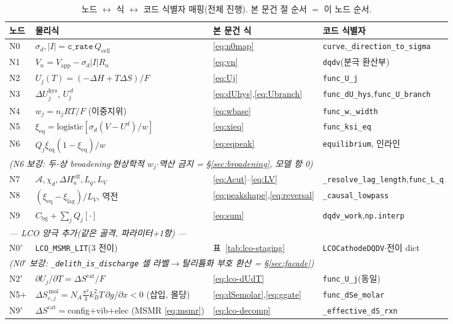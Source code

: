 \documentclass[11pt,a4paper]{article}
\newcommand{\eff}{\mathrm{eff}}
\newcommand{\eq}{\mathrm{eq}}
\newcommand{\app}{\mathrm{app}}
\newcommand{\cell}{\mathrm{cell}}
\newcommand{\bg}{\mathrm{bg}}
\newcommand{\hys}{\mathrm{hys}}
\newcommand{\code}[1]{\texttt{#1}}
\begin{document}
\begin{table}[t]
\centering
\renewcommand{\arraystretch}{1.3}
\caption{노드 $\leftrightarrow$ 식 $\leftrightarrow$ 코드 식별자 매핑(전체 진행). 본 문건 절 순서 $=$ 이 노드 순서.}
\label{tab:nodemap}
\begin{tabular}{l l l l}
\toprule
노드 & 물리식 & 본 문건 식 & 코드 식별자 \\
\midrule
N0 & $\sigma_d,|I|=\code{c\_rate}\,Q_\cell$ & \eqref{eq:n0map} & \code{curve},\code{\_direction\_to\_sigma} \\
N1 & $V_n=V_\app-\sigma_d|I|R_n$ & \eqref{eq:vn} & \code{dqdv}(분극 환산부) \\
N2 & $U_j(T)=(-\Delta H+T\Delta S)/F$ & \eqref{eq:Uj} & \code{func\_U\_j} \\
N3 & $\Delta U_j^\hys$, $U_j^{\,d}$ & \eqref{eq:dUhys},\eqref{eq:Ubranch} & \code{func\_dU\_hys},\code{func\_U\_branch} \\
N4 & $w_j=n_jRT/F$ (이중지위) & \eqref{eq:wbase} & \code{func\_w},\code{\_width} \\
N5 & $\xi_\eq=\mathrm{logistic}[\sigma_d(V-U^d)/w]$ & \eqref{eq:xieq} & \code{func\_ksi\_eq} \\
N6 & $Q_j\xi_\eq(1-\xi_\eq)/w$ & \eqref{eq:eqpeak} & \code{equilibrium}, 인라인 \\
\multicolumn{4}{l}{\emph{\quad(N6 보강: 두-상 broadening$\cdot$현상학적 $w_j$$\cdot$역산 금지 = \S\ref{sec:broadening}, 모델 항 0)}}\\
N7 & $\mathcal A,\chi_d,\Delta H_a^\eff,L_q,L_V$ & \eqref{eq:Acut}--\eqref{eq:LV} & \code{\_resolve\_lag\_length},\code{func\_L\_q} \\
N8 & $(\xi_\eq-\xi_\mathrm{lag})/L_V$, 역전 & \eqref{eq:peakshape},\eqref{eq:reversal} & \code{\_causal\_lowpass} \\
N9 & $C_\bg+\sum_jQ_j[\cdot]$ & \eqref{eq:sum} & \code{dqdv\_work},\code{np.interp} \\
\midrule
\multicolumn{4}{l}{\emph{— LCO 양극 추가(같은 골격, 파라미터+1항) —}}\\
N0$'$ & \code{LCO\_MSMR\_LIT}(3 전이) & 표~\ref{tab:lco-staging} & \code{LCOCathodeDQDV}$\cdot$전이 dict \\
\multicolumn{4}{l}{\emph{\quad(N0$'$ 보강: \code{\_delith\_is\_discharge} 셀 라벨$\to$탈리튬화 부호 환산 = \S\ref{sec:facade})}}\\
N2$'$ & $\partial U_j/\partial T=\Delta S^\mathrm{cat}/F$ & \eqref{eq:lco-dUdT} & \code{func\_U\_j}(동일) \\
N5$+$ & $\Delta S_{e,j}^{\,\mathrm{mol}}=N_A\tfrac{\pi^2}{3}k_B^2T\,\partial g/\partial x<0$ (삽입, 몰당) & \eqref{eq:dSemolar},\eqref{eq:ggate} & \code{func\_dSe\_molar} \\
N9$'$ & $\Delta S^\mathrm{cat}=$config$+$vib$+$elec (MSMR \eqref{eq:msmr}) & \eqref{eq:lco-decomp} & \code{\_effective\_dS\_rxn} \\
\bottomrule
\end{tabular}
\end{table}
\end{document}
